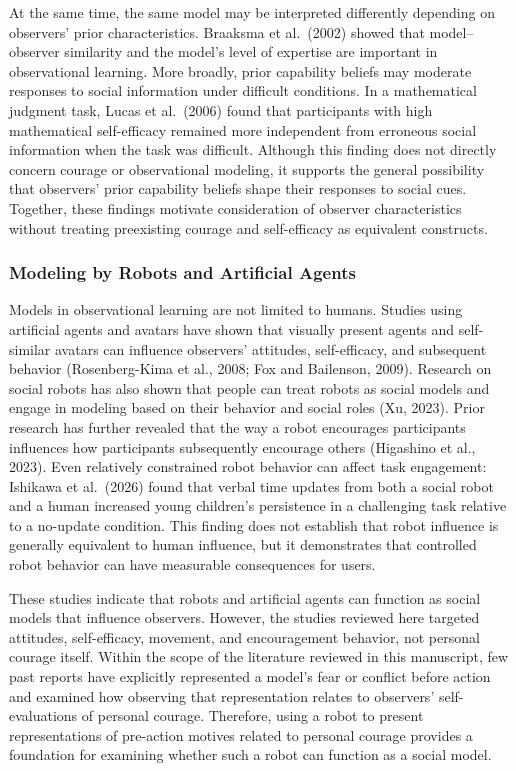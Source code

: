\documentclass[
]{article}
\begin{document}
At the same time, the same model may be interpreted differently
depending on observers' prior characteristics. Braaksma et al.~(2002)
showed that model--observer similarity and the model's level of
expertise are important in observational learning. More broadly, prior
capability beliefs may moderate responses to social information under
difficult conditions. In a mathematical judgment task, Lucas et
al.~(2006) found that participants with high mathematical self-efficacy
remained more independent from erroneous social information when the
task was difficult. Although this finding does not directly concern
courage or observational modeling, it supports the general possibility
that observers' prior capability beliefs shape their responses to social
cues. Together, these findings motivate consideration of observer
characteristics without treating preexisting courage and self-efficacy
as equivalent constructs.

\subsubsection{Modeling by Robots and Artificial
Agents}\label{modeling-by-robots-and-artificial-agents}

Models in observational learning are not limited to humans. Studies
using artificial agents and avatars have shown that visually present
agents and self-similar avatars can influence observers' attitudes,
self-efficacy, and subsequent behavior (Rosenberg-Kima et al., 2008; Fox
and Bailenson, 2009). Research on social robots has also shown that
people can treat robots as social models and engage in modeling based on
their behavior and social roles (Xu, 2023). Prior research has further
revealed that the way a robot encourages participants influences how
participants subsequently encourage others (Higashino et al., 2023).
Even relatively constrained robot behavior can affect task engagement:
Ishikawa et al.~(2026) found that verbal time updates from both a social
robot and a human increased young children's persistence in a
challenging task relative to a no-update condition. This finding does
not establish that robot influence is generally equivalent to human
influence, but it demonstrates that controlled robot behavior can have
measurable consequences for users.

These studies indicate that robots and artificial agents can function as
social models that influence observers. However, the studies reviewed
here targeted attitudes, self-efficacy, movement, and encouragement
behavior, not personal courage itself. Within the scope of the
literature reviewed in this manuscript, few past reports have explicitly
represented a model's fear or conflict before action and examined how
observing that representation relates to observers' self-evaluations of
personal courage. Therefore, using a robot to present representations of
pre-action motives related to personal courage provides a foundation for
examining whether such a robot can function as a social model.
\end{document}
